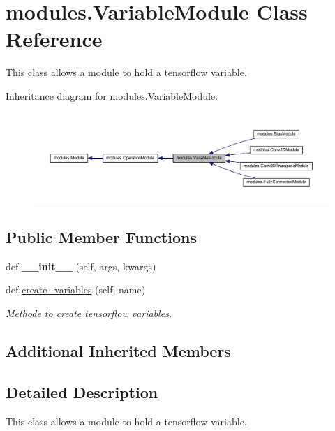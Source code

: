 \hypertarget{classmodules_1_1_variable_module}{}\section{modules.\+Variable\+Module Class Reference}
\label{classmodules_1_1_variable_module}


This class allows a module to hold a tensorflow variable.  




Inheritance diagram for modules.\+Variable\+Module\+:\nopagebreak
\begin{figure}[H]
\begin{center}
\leavevmode
\includegraphics[width=350pt]{classmodules_1_1_variable_module__inherit__graph}
\end{center}
\end{figure}
\subsection*{Public Member Functions}
\begin{DoxyCompactItemize}
\item 
\mbox{\label{classmodules_1_1_variable_module_a01b71eae9cc4d56107269d110a5a41c4}} 
def {\bfseries \+\_\+\+\_\+init\+\_\+\+\_\+} (self, args, kwargs)
\item 
def \hyperlink{classmodules_1_1_variable_module_a7a01e27208c41122163147ff0cf73fe8}{create\+\_\+variables} (self, name)
\begin{DoxyCompactList}\small\item\em Methode to create tensorflow variables. \end{DoxyCompactList}\end{DoxyCompactItemize}
\subsection*{Additional Inherited Members}


\subsection{Detailed Description}
This class allows a module to hold a tensorflow variable. 

